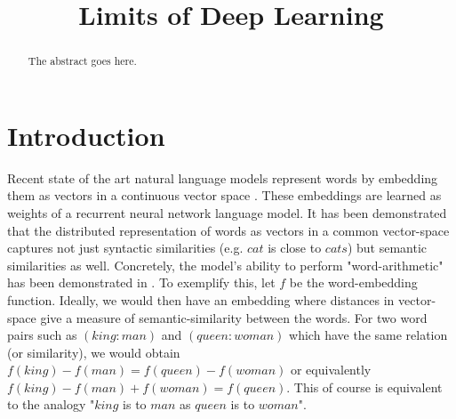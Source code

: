 \documentclass[conference]{IEEEtran}
\begin{document}
%
\title{Limits of Deep Learning}


\author{
\and
{}
}


\maketitle

\begin{abstract}
The abstract goes here.
\end{abstract}



%
\IEEEpeerreviewmaketitle


\section{Introduction}

Recent state of the art natural language models represent words by embedding them
as vectors in a continuous vector space \cite{mikolov2013efficient} \cite{pennington2014glove}.
These embeddings are learned as weights of a recurrent neural network language model.
It has been demonstrated that the distributed representation of words as vectors
in a common vector-space captures not just syntactic similarities (e.g. $cat$
is close to $cats$) but semantic similarities as well. Concretely, the model's ability to
perform "word-arithmetic" has been demonstrated in \cite{mikolov2013linguistic}.
To exemplify this, let $f$ be the word-embedding function. Ideally, we would then
have an embedding where distances in vector-space give a measure of
semantic-similarity between the words. For two word pairs such as $(king:man)$
and $(queen:woman)$ which have the same relation (or similarity), we would
obtain $f(king)-f(man) = f(queen) - f(woman)$ or equivalently $f(king)-f(man) +
f(woman) = f(queen)$. This of course is equivalent to the analogy "$king$ is
to $man$ as $queen$ is to $woman$". 
\end{document}
